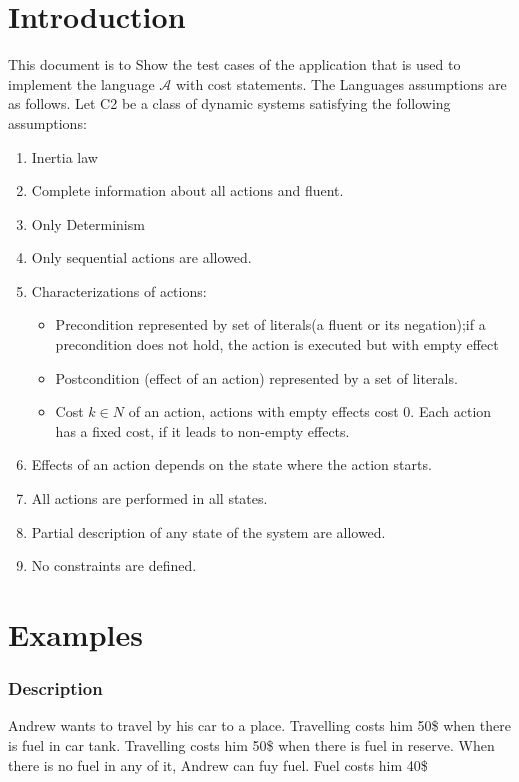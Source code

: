 \documentclass[11pt]{article}
\begin{document}
	\section{Introduction}\label{sec:intro}
	This document is to Show the test cases of the application that is used to implement the language $\mathcal{A}$ with cost statements. The Languages assumptions are as follows.
	Let C2 be a class of dynamic systems satisfying the following assumptions:
	\begin{enumerate}
		\item Inertia law
		\item Complete information about all actions and fluent. 
		\item Only Determinism
		\item Only sequential actions are allowed.
		\item Characterizations of actions:\begin{itemize}
			\item Precondition represented by set of literals(a fluent or its negation);if a precondition does not hold, the action is executed but with empty effect
			\item Postcondition (effect of an action) represented by a set of literals.
			\item Cost $k \in N $ of an action, actions with empty effects cost 0. Each action has a fixed cost, if it leads to non-empty effects. 
		\end{itemize}
		\item Effects of an action depends on the state where the action starts.
		\item All actions are performed in all states.
		\item Partial description of any state of the system are allowed.
		\item No constraints are defined.	 
	\end{enumerate}
	\section{Examples}\label{sec:Examples}
	\subsubsection{Description}\label{par:p101}
	Andrew wants to travel by his car to a place. Travelling costs him 50\$ when there is fuel in car tank. Travelling costs him 50\$ when there is fuel in reserve. When there is no fuel in any of it, Andrew can fuy fuel. Fuel costs him 40\$
\end{document}
